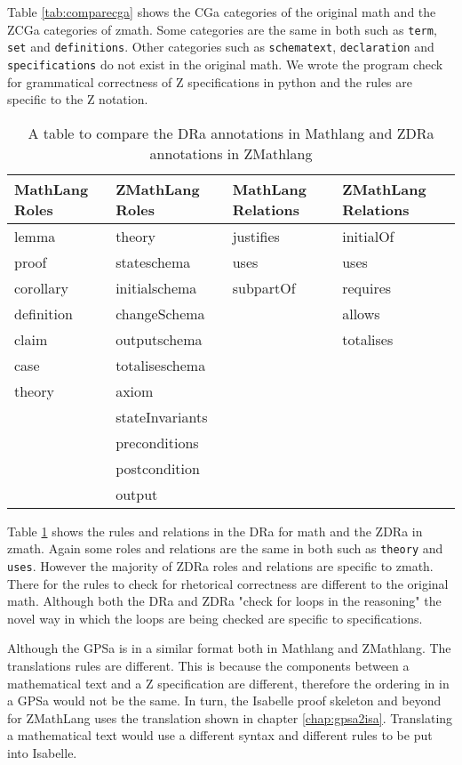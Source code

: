 Table \ref{tab:comparecga} shows the CGa categories of the original \gls{math}
and the ZCGa categories of \gls{zmath}. Some categories are the same in both
such as \texttt{term}, \texttt{set} and \texttt{definitions}. Other categories
such as \texttt{schematext}, \texttt{declaration} and \texttt{specifications} do
not exist in the original \gls{math}. We wrote the program check for grammatical
correctness of Z specifications in python and the rules are specific to the Z notation.

\begin{table}[H]
    \centering
    \begin{tabular}{|l | l || l | l |}
        \hline
        MathLang Roles & ZMathLang Roles & MathLang Relations & ZMathLang Relations \\
        \hline
        lemma & theory & justifies & initialOf \\
        proof & stateschema & uses & uses \\
        corollary & initialschema & subpartOf & requires \\
        definition & changeSchema & & allows \\
        claim & outputschema & & totalises \\
        case & totaliseschema & & \\
        theory & axiom & & \\
        & stateInvariants & & \\
        & preconditions & & \\
        & postcondition & & \\
        & output & & \\       
        \hline
    \end{tabular}
    \caption{A table to compare the DRa annotations in Mathlang and ZDRa annotations in ZMathlang \label{tab:comparedra}}
\end{table}

Table \ref{tab:comparedra} shows the rules and relations in the DRa for
\gls{math} and the ZDRa in \gls{zmath}. Again some roles and relations are the same in both
such as \texttt{theory} and \texttt{uses}. However the majority of ZDRa roles
and relations are specific to \gls{zmath}. There for the rules to check for
rhetorical correctness are different to the original \gls{math}. Although both
the DRa and ZDRa "check for loops in the reasoning" the novel way in which the
loops are being checked are specific to specifications.

Although the GPSa is in a similar format both in Mathlang and ZMathlang. The
translations rules are different. This is because the components between a
mathematical text and a Z specification are different, therefore the ordering in
in a GPSa would not be the same. In turn, the Isabelle proof skeleton and beyond
for ZMathLang uses the translation shown in chapter \ref{chap:gpsa2isa}.
Translating a mathematical text would use a different syntax and different
rules to be put into Isabelle.


